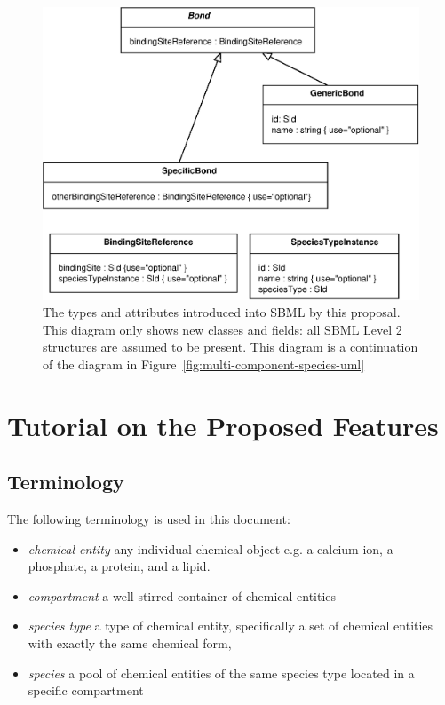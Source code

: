\documentclass{cekarticle}
\begin{document}
\begin{figure}[h]
  \vspace*{8pt}
  \centering
  \includegraphics[scale = 0.7]{multi-component-species-uml2.eps}
  \caption{The types and attributes introduced into SBML by this proposal.  This diagram
  only shows new classes and fields: all SBML Level 2 structures are assumed to be present.
  This diagram is a continuation of the diagram in Figure~\ref{fig:multi-component-species-uml}}
  \label{fig:multi-component-species-uml2}
\end{figure}

\clearpage

\section{Tutorial on the Proposed Features}
\label{sec:tutorial}

\subsection{Terminology}

The following terminology is used in this document:
\begin{itemize}
\item \emph{chemical entity} any individual chemical object
  e.g. a calcium ion, a phosphate, a protein, and a lipid.

\item \emph{compartment} a well stirred container of chemical entities

\item \emph{species type} a type of chemical entity,
  specifically a set of chemical entities with exactly the same chemical form,

\item \emph{species} a pool of chemical entities of the same species type located in a
  specific compartment
\end{itemize}
\end{document}
